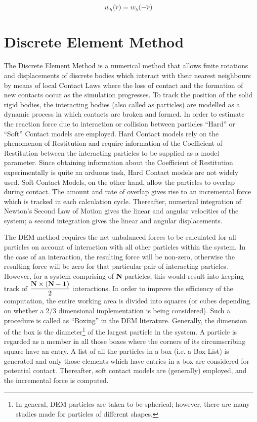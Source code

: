  \begin{eqnarray}\label{eq:kernel-symmetry}
  \textit{w$_h(\widetilde{r}$)} = \textit{w$_h(-\widetilde{r}$)}
 \end{eqnarray}

\section{Discrete Element Method} \label{sec:DEM}

The Discrete Element Method \cite{mishra} is a numerical method that allows finite rotations and displacements of discrete bodies which interact with their nearest neighbours by means of local Contact Laws where the loss of contact and the formation of new contacts occur as the simulation progresses. To track the position of the solid rigid bodies, the interacting bodies (also called as particles) are modelled as a dynamic process in which contacts are broken and formed. In order to estimate the reaction force due to interaction or collision between particles ``Hard'' or ``Soft'' Contact models are employed. Hard Contact models rely on the phenomenon of Restitution and require information of the Coefficient of Restitution between the interacting particles to be supplied as a model parameter. Since obtaining information about the Coefficient of Restitution experimentally is quite an arduous task, Hard Contact models are not widely used. Soft Contact Models, on the other hand, allow the particles to overlap during contact. The amount and rate of overlap gives rise to an incremental force which is tracked in each calculation cycle. Thereafter, numerical integration of Newton's Second Law of Motion gives the linear and angular velocities of the system; a second integration gives the linear and angular displacements.

The DEM method requires the net unbalanced forces to be calculated for all particles on account of interaction with all other particles within the system. In the case of an interaction, the resulting force will be non-zero, otherwise the resulting force will be zero for that particular pair of interacting particles. However, for a system comprising of \textbf{N} particles, this would result into keeping track of $\dfrac{{\bf{N}} \times {\bf{(N-1)}}}{2}$ interactions. In order to improve the efficiency of the computation, the entire working area is divided into squares (or cubes depending on whether a 2/3 dimensional implementation is being considered). Such a procedure is called as ``Boxing'' in the DEM literature. Generally, the dimension of the box is the diameter\footnote{In general, DEM particles are taken to be spherical; however, there are many studies made for particles of different shapes.} of the largest particle in the system. A particle is regarded as a member in all those boxes where the corners of its circumscribing square have an entry.  A list of all the particles in a box (i.e. a Box List) is generated and only those elements which have entries in a box are considered for potential contact. Thereafter, soft contact models are (generally) employed, and the incremental force is computed.